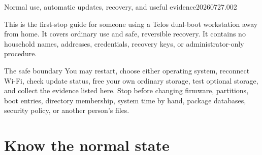 


  {Normal use, automatic updates, recovery, and useful evidence}{20260727.002}
\newcommand{\ownercheck}[2]{\par\needspace{3\baselineskip}\noindent
  \begin{tabularx}{\linewidth}{@{}p{.30\linewidth}L@{}}
  {\footnotesize\textbf{Do:} #1} & {\footnotesize\textbf{Check:} #2}\\
  \end{tabularx}\vspace{.16em}}



This is the first-stop guide for someone using a Telos dual-boot workstation
away from home. It covers ordinary use and safe, reversible recovery. It
contains no household names, addresses, credentials, recovery keys, or
administrator-only procedure.

\begin{gate}{The safe boundary}
You may restart, choose either operating system, reconnect Wi-Fi, check update
status, free your own ordinary storage, test optional storage, and collect the
evidence listed here. Stop before changing firmware, partitions, boot entries,
directory membership, system time by hand, package databases, security policy,
or another person's files.
\end{gate}

\section{Know the normal state}

\begin{center}
\end{center}

